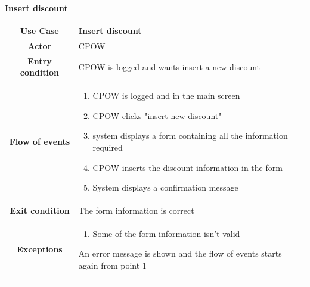 \documentclass[table, 12pt]{article} %
\begin{document}
\begin{itemize}
            \begin{table}[H]
                \item[] \textbf{Insert discount}
                \item[]
                \centering
                \begin{tabular}{|c |m{}|}
                    \hline
                    \textbf{Use Case} & Insert discount\\ \hline
                    \textbf{Actor} & CPOW\\ \hline
                    \textbf{Entry condition} & CPOW is logged and wants insert a new discount \\  \hline
                    \textbf{Flow of events} & \begin{enumerate}
                                                \item CPOW is logged and in the main screen
                                                \item CPOW clicks "insert new discount"
                                                \item system displays a form containing all the information required
                                                \item CPOW inserts the discount information in the form
                                                \item System displays a confirmation message
                                            \end{enumerate}\\ \hline
                    \textbf{Exit condition} &  The form information is correct \\ \hline
                    \textbf{Exceptions} &  \begin{enumerate}
                        \item Some of the form information isn't valid
                    \end{enumerate}
                    An error message is shown and the flow of events starts again from point 1\\ \hline
                \end{tabular}
            \end{table}


\end{itemize}
\end{document}
